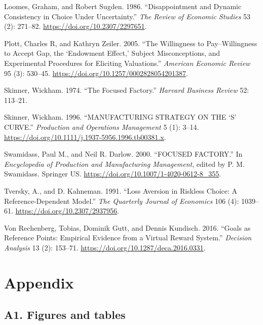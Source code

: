 \documentclass[
  12,
  letterpaper,
  DIV=11,
  numbers=noendperiod]{scrartcl}
\newlength{\cslhangindent}
\newenvironment{CSLReferences}[2] %
 {\begin{list}{}{%
  \setlength{\itemindent}{0pt}
  \setlength{\leftmargin}{0pt}
  \setlength{\parsep}{0pt}
  \ifodd #1
   \setlength{\leftmargin}{\cslhangindent}
   \setlength{\itemindent}{-1\cslhangindent}
  \fi
  \setlength{\itemsep}{#2\baselineskip}}}
 {\end{list}}
\begin{document}
\begin{CSLReferences}{1}{1}
Loomes, Graham, and Robert Sugden. 1986. {``Disappointment and {Dynamic
Consistency} in {Choice} Under {Uncertainty}.''} \emph{The Review of
Economic Studies} 53 (2): 271--82.
\url{https://doi.org/10.2307/2297651}.

Plott, Charles R, and Kathryn Zeiler. 2005. {``The {Willingness} to
{Pay}--{Willingness} to {Accept Gap}, the {`{Endowment Effect},'}
{Subject Misconceptions}, and {Experimental Procedures} for {Eliciting
Valuations}.''} \emph{American Economic Review} 95 (3): 530--45.
\url{https://doi.org/10.1257/0002828054201387}.

Skinner, Wickham. 1974. {``The Focused Factory.''} \emph{Harvard
Business Review} 52: 113--21.

Skinner, Wickham. 1996. {``{MANUFACTURING STRATEGY ON THE} {`{S}'}
{CURVE}.''} \emph{Production and Operations Management} 5 (1): 3--14.
\url{https://doi.org/10.1111/j.1937-5956.1996.tb00381.x}.

Swamidass, Paul M., and Neil R. Darlow. 2000. {``{FOCUSED FACTORY}.''}
In \emph{Encyclopedia of {Production} and {Manufacturing Management}},
edited by P. M. Swamidass. Springer US.
\url{https://doi.org/10.1007/1-4020-0612-8_355}.

Tversky, A., and D. Kahneman. 1991. {``Loss {Aversion} in {Riskless
Choice}: {A Reference-Dependent Model}.''} \emph{The Quarterly Journal
of Economics} 106 (4): 1039--61. \url{https://doi.org/10.2307/2937956}.

Von Rechenberg, Tobias, Dominik Gutt, and Dennis Kundisch. 2016.
{``Goals as {Reference Points}: {Empirical Evidence} from a {Virtual
Reward System}.''} \emph{Decision Analysis} 13 (2): 153--71.
\url{https://doi.org/10.1287/deca.2016.0331}.

\end{CSLReferences}

\newpage

\section{Appendix}\label{appendix}

\subsection{A1. Figures and tables}\label{a1.-figures-and-tables}
\end{document}
